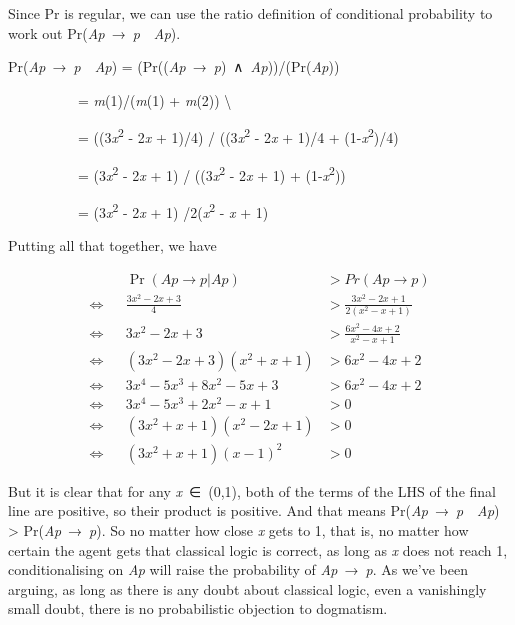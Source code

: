 \documentclass[
  10pt,
  letterpaper,
  DIV=11,
  numbers=noendperiod,
  twoside]{scrartcl}
\begin{document}
Since Pr is regular, we can use the ratio definition of conditional
probability to work out Pr(\emph{Ap}~→~\emph{p}~\textbar~\emph{Ap}).

Pr(\emph{Ap}~→~\emph{p}~\textbar~\emph{Ap}) =
(Pr((\emph{Ap}~→~\emph{p})~∧~\emph{Ap}))/(Pr(\emph{Ap}))\\
\strut ~~~~~~~~~~= \emph{m}(1)/(\emph{m}(1) + \emph{m}(2))
\textbackslash{}\\
\strut ~~~~~~~~~~= ((3\emph{x}\textsuperscript{2} - 2\emph{x} + 1)/4) /
((3\emph{x}\textsuperscript{2} - 2\emph{x} + 1)/4 +
(1-\emph{x}\textsuperscript{2})/4)\\
\strut ~~~~~~~~~~= (3\emph{x}\textsuperscript{2} - 2\emph{x} + 1) /
((3\emph{x}\textsuperscript{2} - 2\emph{x} + 1) +
(1-\emph{x}\textsuperscript{2}))\\
\strut ~~~~~~~~~~= (3\emph{x}\textsuperscript{2} - 2\emph{x} + 1)
/2(\emph{x}\textsuperscript{2} - \emph{x} + 1)

Putting all that together, we have

\[
\begin{aligned}
&& \Pr(Ap \rightarrow p | Ap) &> Pr(Ap \rightarrow p) \\
\Leftrightarrow &&  \frac{3x^2 - 2x + 3}{4}  &> \frac{3x^2 - 2x + 1}{2(x^2 - x + 1)} \\
\Leftrightarrow && 3x^2 - 2x + 3  &> \frac{6x^2 - 4x + 2}{x^2 - x + 1} \\
\Leftrightarrow && (3x^2 - 2x + 3)(x^2 + x + 1)  &> 6x^2 - 4x + 2 \\
\Leftrightarrow && 3x^4 - 5x^3 + 8x^2 - 5x + 3  &> 6x^2 - 4x + 2 \\
\Leftrightarrow && 3x^4 - 5x^3 + 2x^2 - x + 1 &> 0 \\
\Leftrightarrow && (3x^2 + x + 1)(x^2 - 2x + 1) &> 0 \\
\Leftrightarrow && (3x^2 + x + 1)(x - 1)^2 &> 0
\end{aligned}
\]

But it is clear that for any \emph{x}~∈~(0,1), both of the terms of the
LHS of the final line are positive, so their product is positive. And
that means Pr(\emph{Ap}~→~\emph{p}~\textbar~\emph{Ap}) \textgreater{}
Pr(\emph{Ap}~→~\emph{p}). So no matter how close \emph{x} gets to 1,
that is, no matter how certain the agent gets that classical logic is
correct, as long as \emph{x} does not reach 1, conditionalising on
\emph{Ap} will raise the probability of \emph{Ap}~→~\emph{p}. As we've
been arguing, as long as there is any doubt about classical logic, even
a vanishingly small doubt, there is no probabilistic objection to
dogmatism.
\end{document}
